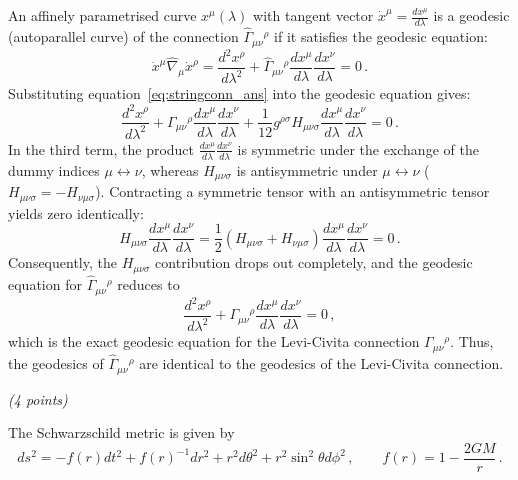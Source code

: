 \documentclass[12pt]{article}
\newcommand{\be}{\begin{equation}}
\newcommand{\ee}{\end{equation}}
\newcounter{quesno}
\newcommand{\ques}[1]{\vspace{2.5em}\stepcounter{quesno}
\noindent{\bf\large Question \thequesno.} \emph{(#1 points)}\par\vspace{0.5em}
}
\begin{document}
\begin{enumerate}[label=\alph*)]
An affinely parametrised curve $x^\mu(\lambda)$ with tangent vector $\dot{x}^\mu = \frac{dx^\mu}{d\lambda}$ is a geodesic (autoparallel curve) of the connection $\hat\Gamma_{\mu\nu}{}^\rho$ if it satisfies the geodesic equation:
\be
\dot{x}^\mu \hat\nabla_\mu \dot{x}^\rho = \frac{d^2 x^\rho}{d\lambda^2} + \hat\Gamma_{\mu\nu}{}^\rho \frac{dx^\mu}{d\lambda} \frac{dx^\nu}{d\lambda} = 0 \,.
\ee
Substituting equation~\eqref{eq:stringconn_ans} into the geodesic equation gives:
\be
\frac{d^2 x^\rho}{d\lambda^2} + \Gamma_{\mu\nu}{}^\rho \frac{dx^\mu}{d\lambda} \frac{dx^\nu}{d\lambda} + \frac{1}{12} g^{\rho\sigma} H_{\mu\nu\sigma} \frac{dx^\mu}{d\lambda} \frac{dx^\nu}{d\lambda} = 0 \,.
\ee
In the third term, the product $\frac{dx^\mu}{d\lambda} \frac{dx^\nu}{d\lambda}$ is symmetric under the exchange of the dummy indices $\mu \leftrightarrow \nu$, whereas $H_{\mu\nu\sigma}$ is antisymmetric under $\mu \leftrightarrow \nu$ ($H_{\mu\nu\sigma} = -H_{\nu\mu\sigma}$). Contracting a symmetric tensor with an antisymmetric tensor yields zero identically:
\be
H_{\mu\nu\sigma} \frac{dx^\mu}{d\lambda} \frac{dx^\nu}{d\lambda} = \frac{1}{2} \left( H_{\mu\nu\sigma} + H_{\nu\mu\sigma} \right) \frac{dx^\mu}{d\lambda} \frac{dx^\nu}{d\lambda} = 0 \,.
\ee
Consequently, the $H_{\mu\nu\sigma}$ contribution drops out completely, and the geodesic equation for $\hat\Gamma_{\mu\nu}{}^\rho$ reduces to
\be
\frac{d^2 x^\rho}{d\lambda^2} + \Gamma_{\mu\nu}{}^\rho \frac{dx^\mu}{d\lambda} \frac{dx^\nu}{d\lambda} = 0 \,,
\ee
which is the exact geodesic equation for the Levi-Civita connection $\Gamma_{\mu\nu}{}^\rho$. Thus, the geodesics of $\hat\Gamma_{\mu\nu}{}^\rho$ are identical to the geodesics of the Levi-Civita connection.
\end{enumerate}


\ques{4}
The Schwarzschild metric is given by
\be
ds^2 = - f(r) dt^2 + f(r)^{-1} dr^2 + r^2 d \theta^2 + r^2 \sin^2 \theta d\phi^2 \,, \qquad f(r) = 1 - \frac{2GM}{r} \,.
\ee
\end{document}
